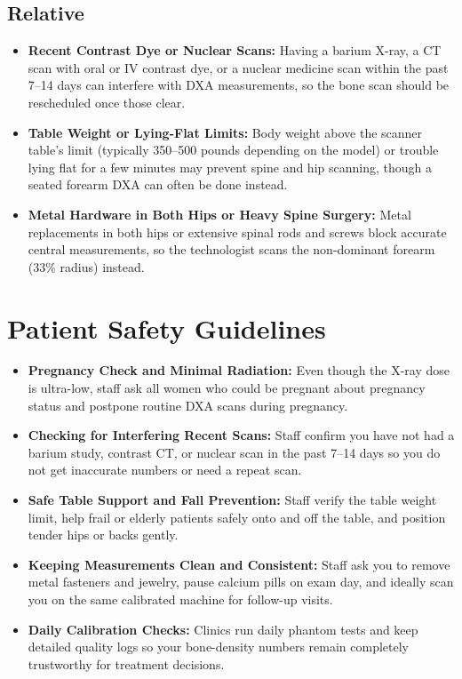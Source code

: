 \subsection{Relative}
\begin{itemize}
\item \textbf{Recent Contrast Dye or Nuclear Scans:} Having a barium X-ray, a CT scan with oral or IV contrast dye, or a nuclear medicine scan within the past 7--14 days can interfere with DXA measurements, so the bone scan should be rescheduled once those clear.
\item \textbf{Table Weight or Lying-Flat Limits:} Body weight above the scanner table's limit (typically 350--500 pounds depending on the model) or trouble lying flat for a few minutes may prevent spine and hip scanning, though a seated forearm DXA can often be done instead.
\item \textbf{Metal Hardware in Both Hips or Heavy Spine Surgery:} Metal replacements in both hips or extensive spinal rods and screws block accurate central measurements, so the technologist scans the non-dominant forearm (33\% radius) instead.
\end{itemize}

\section{Patient Safety Guidelines}
\begin{itemize}
\item \textbf{Pregnancy Check and Minimal Radiation:} Even though the X-ray dose is ultra-low, staff ask all women who could be pregnant about pregnancy status and postpone routine DXA scans during pregnancy.
\item \textbf{Checking for Interfering Recent Scans:} Staff confirm you have not had a barium study, contrast CT, or nuclear scan in the past 7--14 days so you do not get inaccurate numbers or need a repeat scan.
\item \textbf{Safe Table Support and Fall Prevention:} Staff verify the table weight limit, help frail or elderly patients safely onto and off the table, and position tender hips or backs gently.
\item \textbf{Keeping Measurements Clean and Consistent:} Staff ask you to remove metal fasteners and jewelry, pause calcium pills on exam day, and ideally scan you on the same calibrated machine for follow-up visits.
\item \textbf{Daily Calibration Checks:} Clinics run daily phantom tests and keep detailed quality logs so your bone-density numbers remain completely trustworthy for treatment decisions.
\end{itemize}

